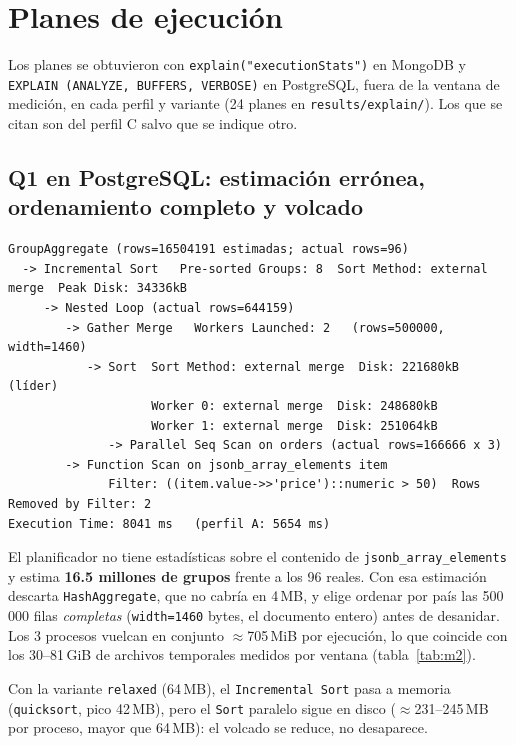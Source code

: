 \documentclass[11pt,a4paper]{article}
\begin{document}
\section{Planes de ejecución}\label{sec:planes}

Los planes se obtuvieron con \texttt{explain("executionStats")} en MongoDB y \texttt{EXPLAIN (ANALYZE, BUFFERS, VERBOSE)} en PostgreSQL, fuera de la ventana de medición, en cada perfil y variante (24 planes en \texttt{results/explain/}). Los que se citan son del perfil C salvo que se indique otro.

\subsection{Q1 en PostgreSQL: estimación errónea, ordenamiento completo y volcado}

\begin{lstlisting}
GroupAggregate (rows=16504191 estimadas; actual rows=96)
  -> Incremental Sort   Pre-sorted Groups: 8  Sort Method: external merge  Peak Disk: 34336kB
     -> Nested Loop (actual rows=644159)
        -> Gather Merge   Workers Launched: 2   (rows=500000, width=1460)
           -> Sort  Sort Method: external merge  Disk: 221680kB   (líder)
                    Worker 0: external merge  Disk: 248680kB
                    Worker 1: external merge  Disk: 251064kB
              -> Parallel Seq Scan on orders (actual rows=166666 x 3)
        -> Function Scan on jsonb_array_elements item
              Filter: ((item.value->>'price')::numeric > 50)  Rows Removed by Filter: 2
Execution Time: 8041 ms   (perfil A: 5654 ms)
\end{lstlisting}

El planificador no tiene estadísticas sobre el contenido de \texttt{jsonb\_array\_elements} y estima \textbf{16.5 millones de grupos} frente a los 96 reales. Con esa estimación descarta \texttt{HashAggregate}, que no cabría en 4\,MB, y elige ordenar por país las 500\,000 filas \emph{completas} (\texttt{width=1460} bytes, el documento entero) antes de desanidar. Los 3 procesos vuelcan en conjunto $\approx$705\,MiB por ejecución, lo que coincide con los 30--81\,GiB de archivos temporales medidos por ventana (tabla~\ref{tab:m2}).

Con la variante \texttt{relaxed} (64\,MB), el \texttt{Incremental Sort} pasa a memoria (\texttt{quicksort}, pico 42\,MB), pero el \texttt{Sort} paralelo sigue en disco ($\approx$231--245\,MB por proceso, mayor que 64\,MB): el volcado se reduce, no desaparece.
\end{document}

